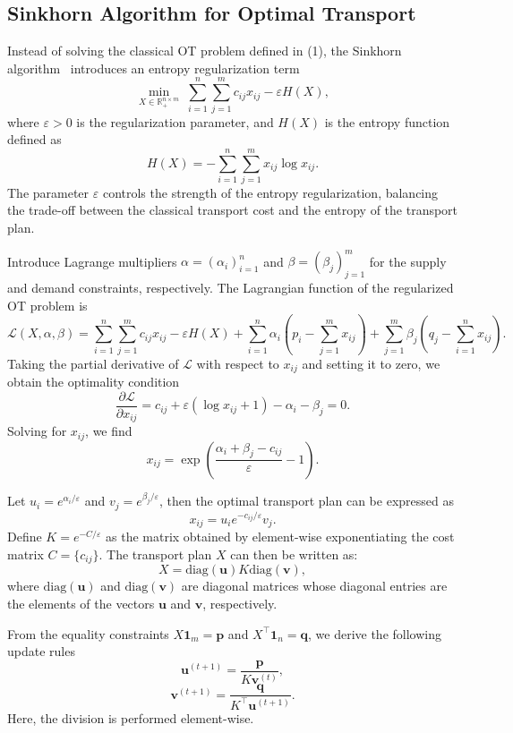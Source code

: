 \documentclass[12pt,a4paper]{article}
\begin{document}
\subsection{Sinkhorn Algorithm for Optimal Transport}

Instead of solving the classical OT problem defined in (1), the Sinkhorn algorithm~\cite{cuturi2013sinkhorn} introduces an entropy regularization term
\[
\min_{X \in \mathbb{R}_{+}^{n \times m}} \; \sum_{i=1}^{n} \sum_{j=1}^{m} c_{ij} x_{ij} - \varepsilon H(X),
\]
where \( \varepsilon > 0 \) is the regularization parameter, and \( H(X) \) is the entropy function defined as
\[
H(X) = -\sum_{i=1}^{n} \sum_{j=1}^{m} x_{ij} \log x_{ij}.
\]
The parameter \( \varepsilon \) controls the strength of the entropy regularization, balancing the trade-off between the classical transport cost and the entropy of the transport plan.

\noindent
Introduce Lagrange multipliers \( \alpha = (\alpha_i)_{i=1}^n \) and \( \beta = (\beta_j)_{j=1}^m \) for the supply and demand constraints, respectively. The Lagrangian function of the regularized OT problem is
\[
\mathcal{L}(X, \alpha, \beta) = \sum_{i=1}^{n} \sum_{j=1}^{m} c_{ij} x_{ij} - \varepsilon H(X) 
+ \sum_{i=1}^{n} \alpha_i \left( p_i - \sum_{j=1}^{m} x_{ij} \right)
+ \sum_{j=1}^{m} \beta_j \left( q_j - \sum_{i=1}^{n} x_{ij} \right).
\]
Taking the partial derivative of \( \mathcal{L} \) with respect to \( x_{ij} \) and setting it to zero, we obtain the optimality condition
\[
\frac{\partial \mathcal{L}}{\partial x_{ij}} = c_{ij} + \varepsilon (\log x_{ij} + 1) - \alpha_i - \beta_j = 0.
\]
Solving for \( x_{ij} \), we find
\[
x_{ij} = \exp\left( \frac{\alpha_i + \beta_j - c_{ij}}{\varepsilon} - 1 \right).
\]

\noindent
Let \( u_i = e^{\alpha_i / \varepsilon} \) and \( v_j = e^{\beta_j / \varepsilon} \), then the optimal transport plan can be expressed as
\[
x_{ij} = u_i e^{-c_{ij} / \varepsilon} v_j.
\]
Define \( K = e^{-C / \varepsilon} \) as the matrix obtained by element-wise exponentiating the cost matrix \( C = \{c_{ij}\} \). The transport plan \( X \) can then be written as:
\[
X = \text{diag}(\mathbf{u}) K \text{diag}(\mathbf{v}),
\]
where \( \text{diag}(\mathbf{u}) \) and \( \text{diag}(\mathbf{v}) \) are diagonal matrices whose diagonal entries are the elements of the vectors \( \mathbf{u} \) and \( \mathbf{v} \), respectively.

\noindent 
From the equality constraints \( X \mathbf{1}_m = \mathbf{p} \) and \( X^\top \mathbf{1}_n = \mathbf{q} \), we derive the following update rules
\[
\mathbf{u}^{(t+1)} = \frac{\mathbf{p}}{K \mathbf{v}^{(t)}},
\]
\[
\mathbf{v}^{(t+1)} = \frac{\mathbf{q}}{K^\top \mathbf{u}^{(t+1)}}.
\]
Here, the division is performed element-wise. 
\end{document}
